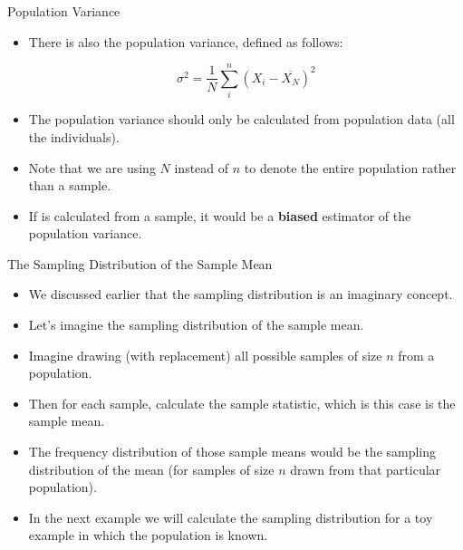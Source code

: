 \documentclass[handout]{beamer}
\begin{document}
\begin{frame}{Population Variance}
\scriptsize{
\begin{itemize}
\item There is also the population variance, defined as follows:

\begin{displaymath}
 \sigma^{2}= \frac{1}{N} \sum_{i}^{n}(X_{i}-\overline{X_{N}})^2
\end{displaymath}

\item The population variance should only be calculated from population data (all the individuals).

\item Note that we are using $N$ instead of $n$ to denote the entire population rather than a sample.

\item If is calculated from a sample, it would be a \textbf{biased} estimator of the population variance.

\end{itemize}


} 
\end{frame}


\begin{frame}[fragile]{The Sampling Distribution of the Sample Mean}
\scriptsize{

\begin{itemize}
\item We discussed earlier that the sampling distribution is an imaginary concept.
\item Let's imagine the sampling distribution of the sample mean.
\item Imagine drawing (with replacement) all possible samples of size $n$ from a population.
\item Then for each sample, calculate the sample statistic, which is this case is the sample mean. 
\item The frequency distribution of those sample means would be the sampling distribution of the mean (for samples of size $n$ drawn from that particular population).
\item In the next example we will calculate the sampling distribution for a toy example in which the population is known.
\end{itemize}


} 
\end{frame}
\end{document}
